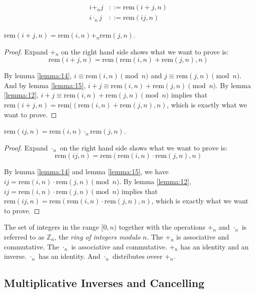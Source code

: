 \documentclass[11pt]{article}
\newcommand{\rem}{\mathrm{rem}}
\begin{document}
\begin{definition}
\begin{align*}
i +_n j &::= \rem(i+j, n) \\
i \cdot_n j &::= \rem(ij, n)
\end{align*}
\end{definition}

\begin{lemma} \label{lemma:17}
$\rem(i+j,n) = \rem(i,n) +_n \rem(j,n)$.
\end{lemma}


\begin{proof}
Expand $+_n$ on the right hand side shows what we want to prove is:
\[
  \rem(i+j,n) = \rem(\rem(i,n)+\rem(j,n),n)
\]

By lemma \ref{lemma:14}, $i \equiv \rem(i,n) \pmod{n}$ and $j \equiv \rem(j,n) \pmod{n}$. And
by lemma \ref{lemma:15}, $i+j \equiv \rem(i,n)+\rem(j,n) \pmod{n}$. By lemma \ref{lemma:12},
$i+j \equiv \rem(i,n) + \rem(j,n) \pmod{n}$ implies that
$\rem(i+j,n) = \rem((\rem(i,n) + \rem(j,n), n)$, which is exactly what we want to prove.
\end{proof}

\begin{lemma} \label{lemma:18}
$\rem(ij,n) = \rem(i,n) \cdot_n \rem(j,n)$.
\end{lemma}

\begin{proof}
Expand $\cdot_n$ on the right hand side shows what we want to prove is:
\[
  \rem(ij,n) = \rem(\rem(i,n) \cdot \rem(j,n),n)
\]

By lemma \ref{lemma:14} and lemma \ref{lemma:15}, we have
$ij = \rem(i,n) \cdot \rem(j,n) \pmod{n}$. By lemma \ref{lemma:12},
$ij = \rem(i,n) \cdot \rem(j,n) \pmod{n}$ implies that
$\rem(ij,n) = \rem(\rem(i,n) \cdot \rem(j,n), n)$, which is exactly what we want to prove.
\end{proof}

The set of integers in the range $[0, n)$ together with the operations $+_n$ and $\cdot_n$
is referred to as $\mathbb{Z}_n$, the \emph{ring of integers modulo} $n$. The $+_n$ is
associative and commutative. The $\cdot_n$ is associative and commutative. $+_n$ has an
identity and an inverse. $\cdot_n$ has an identity. And $\cdot_n$ distributes oveer $+_n$.

\subsection{Multiplicative Inverses and Cancelling}
\end{document}
